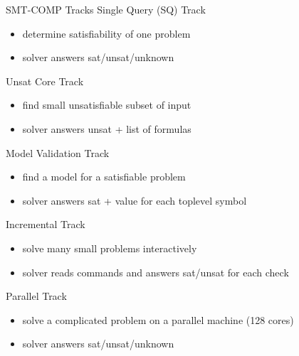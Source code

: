 \documentclass[table]{beamer}
\def\emph#1{\textcolor{MYblue}{#1}}
\begin{document}
\begin{frame}[fragile]{SMT-COMP Tracks}
  \emph{Single Query (SQ) Track}
  \begin{itemize}
  \item determine satisfiability of one problem
  \item solver answers \emph{sat/unsat/unknown}
  \end{itemize}
  \medskip

  \emph{Unsat Core Track}
  \begin{itemize}
  \item find small unsatisfiable subset of input
  \item solver answers \emph{unsat + list of formulas}
  \end{itemize}
  \medskip

  \emph{Model Validation Track}
  \begin{itemize}
  \item find a model for a satisfiable problem
  \item solver answers \emph{sat + value} for each toplevel symbol
  \end{itemize}
  \medskip

  \emph{Incremental Track}
  \begin{itemize}
  \item solve many small problems interactively
  \item solver reads commands and answers \emph{sat/unsat} for each check
  \end{itemize}

  \emph{Parallel Track}
  \begin{itemize}
  \item solve a complicated problem on a parallel machine (128 cores)
  \item solver answers \emph{sat/unsat/unknown}
  \end{itemize}
\end{frame}



\end{document}
